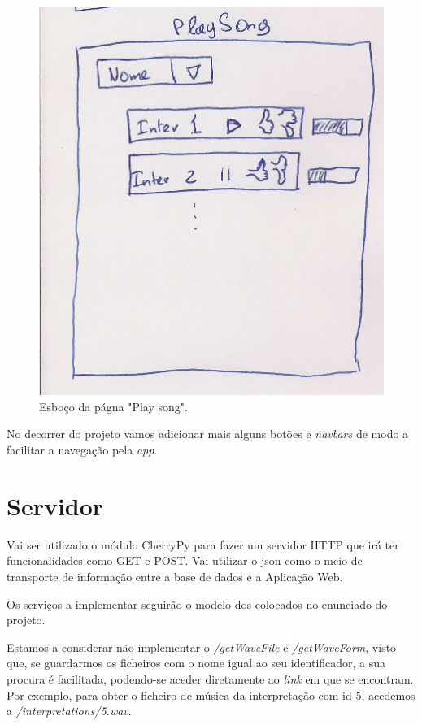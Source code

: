 \documentclass{report}
\begin{document}
\begin{figure}[htp]
\centering
\includegraphics[width=\textwidth]{images/playsong.jpg}
\caption{Esboço da págna "Play song".}
\label{play}
\end{figure}

No decorrer do projeto vamos adicionar mais alguns botões e \textit{navbars} de modo a facilitar a navegação pela \textit{app}.


\chapter{Servidor}
\label{chap.servidor}

Vai ser utilizado o módulo CherryPy \cite{cherry} para fazer um servidor HTTP que irá ter funcionalidades como GET e POST. Vai utilizar o \ac{json} como o meio de transporte de informação entre a base de dados e a Aplicação Web.

Os serviços a implementar seguirão o modelo dos colocados no enunciado do projeto.

Estamos a considerar não implementar o \emph{/getWaveFile} e \emph{/getWaveForm}, visto que, se guardarmos os ficheiros com o nome igual ao seu identificador, a sua procura é facilitada, podendo-se aceder diretamente ao \emph{link} em que se encontram. Por exemplo, para obter o ficheiro de música da interpretação com id 5, acedemos a \emph{/interpretations/5.wav}.
\end{document}
